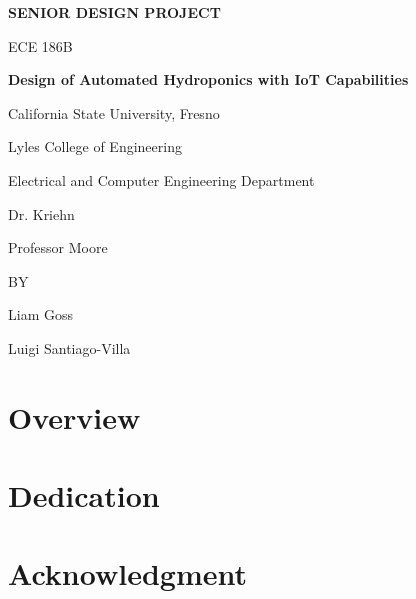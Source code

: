 \documentclass[12pt]{article}
\begin{document}
\begin{titlepage}
    \centering
    {\Large\bfseries SENIOR DESIGN PROJECT\par}
    \vspace{1.5cm}
    {\Large ECE 186B\par}
    \vspace{1.5cm}
    {\Large\bfseries Design of Automated Hydroponics with IoT Capabilities\par}
    \vspace{3cm}
    {\large California State University, Fresno\par}
    {\large Lyles College of Engineering\par}
    {\large Electrical and Computer Engineering Department\par}
    \vspace{2cm}
    {\large Dr. Kriehn\par}
    {\large Professor Moore\par}
    \vspace{2cm}
    {\large BY\par}
    \vspace{1cm}
    {\large Liam Goss\par}
    {\large Luigi Santiago-Villa\par}
\end{titlepage}
\section*{Overview}
\lipsum[1-4] %

\section*{Dedication}
\lipsum[1] %

\section*{Acknowledgment}
\lipsum[1] %

\tableofcontents
\pagebreak
\end{document}
